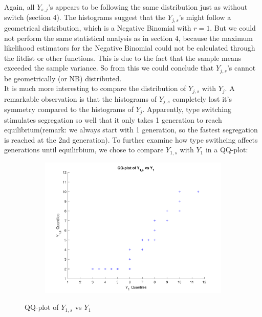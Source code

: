 Again, all $Y_{s,j}$'s appears to be following the same distribution just as without switch (section 4). 
The histograms suggest that the $Y_{j,s}$'s might follow a geometrical distribution, which is a Negative Binomial with $r=1$. 
But we could not perform the same statistical analysis as in section 4, because the maximum likelihood estimators for the Negative Binomial could not be calculated through the fitdist or other functions. 
This is due to the fact that the sample means exceeded the sample variance. So from this we could conclude that $Y_{j,s}$'s cannot be geometrically (or NB) distributed.\\

It is much more interesting to compare the distribution of $Y_{j,s}$ with $Y_{j}$. A remarkable observation is that the histograms of $Y_{j,s}$ completely lost it's symmetry compared to the histograms of $Y_j$. 
Apparently, type switching stimulates segregation so well that it only takes 1 generation to reach equilibrium(remark: we always start with 1 generation, so the fastest segregation is reached at the 2nd generation). 
To further examine how type swithcing affects generations until equilirbium, we chose to compare $Y_{1,s}$ with $Y_1$ in a QQ-plot:

\begin{figure}[H]
    \centering
    \begin{subfigure}{0.8\textwidth}
        \includegraphics[width=\textwidth]{QQplotY1sw.pdf}
    \end{subfigure}
    \caption{QQ-plot of $Y_{1,s}$ vs $Y_1$}
    \label{fig:QQplotSw}
\end{figure}  

